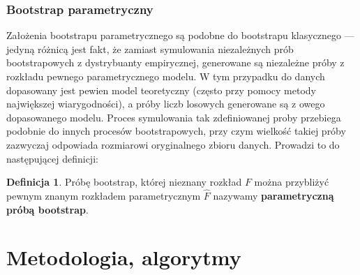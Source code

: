 \documentclass[inzynierska]{pwr_wmat_praca_dyplomowa}
\theoremstyle{plain}
\numberwithin{theorem}{chapter}
\theoremstyle{definition}
\numberwithin{theorem}{chapter}
\newtheorem{definition}[theorem]{Definicja}
\begin{document}
\subsection{Bootstrap parametryczny}
Założenia bootstrapu parametrycznego są podobne do bootstrapu klasycznego --- jedyną różnicą jest fakt, że zamiast symulowania niezależnych prób bootstrapowych z dystrybuanty empirycznej, generowane są niezależne próby z rozkładu pewnego parametrycznego modelu. \cite{efron2}
W tym przypadku do danych dopasowany jest pewien model teoretyczny (często przy pomocy metody największej wiarygodności), a próby liczb losowych generowane są z owego dopasowanego modelu. Proces symulowania tak zdefiniowanej proby przebiega podobnie do innych procesów bootstrapowych, przy czym wielkość takiej próby zazwyczaj odpowiada rozmiarowi oryginalnego zbioru danych. Prowadzi to do następującej definicji:
\begin{definition}
	Próbę bootstrap, której nieznany rozkład $F$ można przybliżyć pewnym znanym rozkładem parametrycznym $\hat{F}$ nazywamy \textbf{parametryczną próbą bootstrap}. 
\end{definition}
 
 
\chapter{Metodologia, algorytmy}\label{rodzial_algorytmy}
\end{document}
